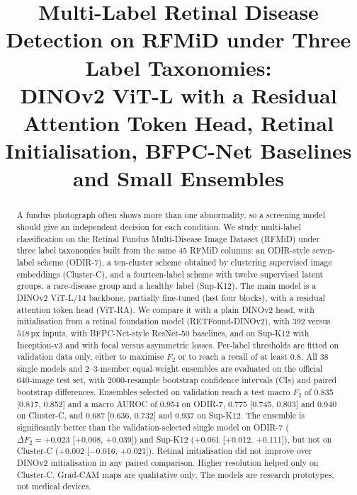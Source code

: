 ﻿\documentclass[conference]{IEEEtran}
\begin{document}
\title{Multi-Label Retinal Disease Detection on RFMiD under Three Label Taxonomies:\\DINOv2 ViT-L with a Residual Attention Token Head, Retinal Initialisation, BFPC-Net Baselines and Small Ensembles}

\author{
}

\maketitle

\begin{abstract}
A fundus photograph often shows more than one abnormality, so a screening model should give an independent decision for each condition.
We study multi-label classification on the Retinal Fundus Multi-Disease Image Dataset (RFMiD) under three label taxonomies built from the same 45 RFMiD columns: an ODIR-style seven-label scheme (ODIR-7), a ten-cluster scheme obtained by clustering supervised image embeddings (Cluster-C), and a fourteen-label scheme with twelve supervised latent groups, a rare-disease group and a healthy label (Sup-K12).
The main model is a DINOv2 ViT-L/14 backbone, partially fine-tuned (last four blocks), with a residual attention token head (ViT-RA). We compare it with a plain DINOv2 head, with initialisation from a retinal foundation model (RETFound-DINOv2), with $392$ versus $518$\,px inputs, with BFPC-Net-style ResNet-50 baselines, and on Sup-K12 with Inception-v3 and with focal versus asymmetric losses.
Per-label thresholds are fitted on validation data only, either to maximise $F_2$ or to reach a recall of at least 0.8.
All 38 single models and 2--3-member equal-weight ensembles are evaluated on the official 640-image test set, with 2000-resample bootstrap confidence intervals (CIs) and paired bootstrap differences.
Ensembles selected on validation reach a test macro $F_2$ of 0.835 [0.817, 0.852] and a macro AUROC of 0.954 on ODIR-7, 0.775 [0.745, 0.803] and 0.940 on Cluster-C, and 0.687 [0.636, 0.732] and 0.937 on Sup-K12.
The ensemble is significantly better than the validation-selected single model on ODIR-7 ($\Delta F_2=+0.023$ [+0.008, +0.039]) and Sup-K12 (+0.061 [+0.012, +0.111]), but not on Cluster-C (+0.002 [$-$0.016, +0.021]).
Retinal initialisation did not improve over DINOv2 initialisation in any paired comparison. Higher resolution helped only on Cluster-C.
Grad-CAM maps are qualitative only. The models are research prototypes, not medical devices.
\end{abstract}
\end{document}
